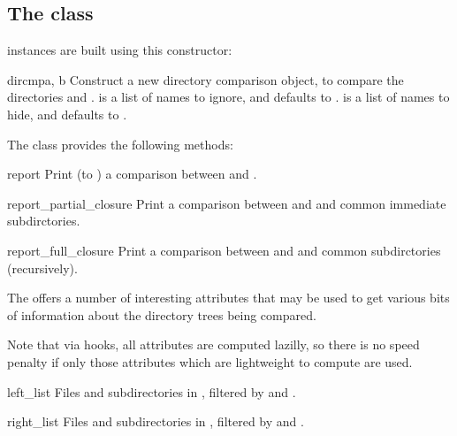 \subsection{The \protect{} class \label{dircmp-objects}}

 instances are built using this constructor:

\begin{classdesc}{dircmp}{a, b}
Construct a new directory comparison object, to compare the
directories  and .  is a list of names to
ignore, and defaults to .  is a
list of names to hide, and defaults to .
\end{classdesc}

The  class provides the following methods:

\begin{methoddesc}[dircmp]{report}{}
Print (to ) a comparison between  and .
\end{methoddesc}

\begin{methoddesc}[dircmp]{report_partial_closure}{}
Print a comparison between  and  and common immediate
subdirctories.
\end{methoddesc}

\begin{methoddesc}[dircmp]{report_full_closure}{}
Print a comparison between  and  and common 
subdirctories (recursively).
\end{methoddesc}


The  offers a number of interesting attributes that may
be used to get various bits of information about the directory trees
being compared.

Note that via  hooks, all attributes are
computed lazilly, so there is no speed penalty if only those
attributes which are lightweight to compute are used.

\begin{memberdesc}[dircmp]{left_list}
Files and subdirectories in , filtered by  and
.
\end{memberdesc}

\begin{memberdesc}[dircmp]{right_list}
Files and subdirectories in , filtered by  and
.
\end{memberdesc}

